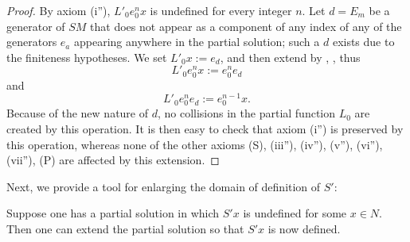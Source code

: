 \begin{proof}  By axiom (i''), $L'_0 e_0^n x$ is undefined for every integer $n$.  Let $d = E_m$ be a generator of $SM$ that does not appear as a component of any index of any of the generators $e_a$ appearing anywhere in the partial solution; such a $d$ exists due to the finiteness hypotheses.  We set $L'_0 x := e_d$, and then extend by , , thus
$$L'_0 e_0^n x := e_0^n e_d$$
and
$$L'_0 e_0^n e_d := e_0^{n-1} x.$$
Because of the new nature of $d$, no collisions in the partial function $L_0$ are created by this operation.  It is then easy to check that axiom (i'') is preserved by this operation, whereas none of the other axioms (S), (iii''), (iv''), (v''), (vi''), (vii''), (P) are affected by this extension.
\end{proof}

Next, we provide a tool for enlarging the domain of definition of $S'$:

\begin{proposition}[Enlarging $S'$]\label{enlarge-S}\leanok  Suppose one has a partial solution in which $S'x$ is undefined for some $x \in N$.  Then one can extend the partial solution so that $S'x$ is now defined.
\end{proposition}

